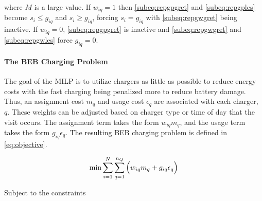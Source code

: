 \documentclass[ee,msthesis]{usuthesis}
\begin{document}
\noindent
where \(M\) is a large value. If \(w_{iq} = 1\) then \autoref{subeq:repgpgret} and \autoref{subeq:repgples} become \(s_i \leq
g_{iq}\) and \(s_i \geq g_{iq}\), forcing \(s_i = g_{iq}\) with \autoref{subeq:repgwgret} being inactive. If \(w_{iq} = 0\),
\autoref{subeq:repgpgret} is inactive and \autoref{subeq:repgwgret} and \autoref{subeq:repgwles} force \(g_{iq} = 0\).

\paragraph{The BEB Charging Problem}
\label{sec:BEB_MILP}
The goal of the MILP is to utilize chargers as little as possible to reduce energy costs with the fast charging being
penalized more to reduce battery damage. Thus, an assignment cost \(m_q\) and usage cost \(\epsilon_q\) are associated with each
charger, \(q\). These weights can be adjusted based on charger type or time of day that the visit occurs. The assignment
term takes the form \(w_{iq}m_q\), and the usage term takes the form \(g_{iq} \epsilon_q\). The resulting BEB charging problem is
defined in \autoref{eq:objective}.

\begin{equation}
\label{eq:objective}
	\min \sum_{i=1}^N \sum_{q=1}^{n_Q} \Big( w_{iq} m_q + g_{iq} \epsilon_q \Big) \\
\end{equation}

Subject to the constraints
\end{document}
